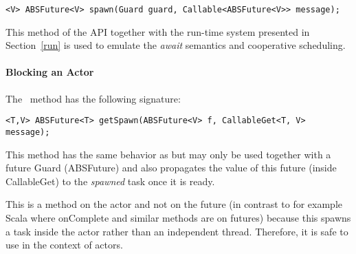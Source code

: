 \begin{lstlisting}
<V> ABSFuture<V> spawn(Guard guard, Callable<ABSFuture<V>> message);
\end{lstlisting}

This method of the API together with the run-time system presented in Section~\ref{run} is used to emulate the \textit{await} semantics and cooperative scheduling. 

\paragraph{Blocking an Actor}
The \gspawn ~method has the following signature:

\begin{lstlisting}
<T,V> ABSFuture<T> getSpawn(ABSFuture<V> f, CallableGet<T, V> message);
\end{lstlisting}

This method has the same behavior as \spawn but may only be used together with a future Guard (ABSFuture) and also propagates the value of this future (inside CallableGet) to the \textit{spawned} task once it is ready.  

This is a method on the actor and not on the future (in contrast to for example Scala where onComplete and similar methods are on futures) because this spawns a task inside the actor rather than an independent thread. Therefore, it is safe to use in the context of actors.

